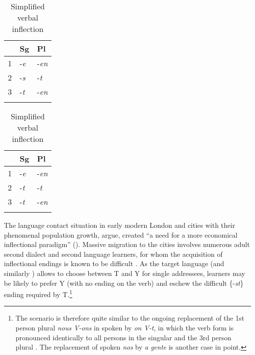 \documentclass[output=paper,hidelinks]{langscibook}
\begin{document}
\begin{table}
\caption{Present indicative in Middle Dutch \citep[195]{Aalberse2015}\label{tab5elsweiler}}
\begin{subtable}[b]{.5\linewidth}
\centering
\caption{Verbal inflection}
\begin{tabular}{l ll} 
  \lsptoprule
            & Sg & Pl\\ 
  \midrule
  1  & -\textit{e}  & -\textit{en} \\
  2  & -\textit{s}  & -\textit{t}  \\
  3  & -\textit{t}  & -\textit{en} \\
  \lspbottomrule
 \end{tabular}
\end{subtable}%
\begin{subtable}[b]{.5\linewidth}
\centering
\caption{Simplified verbal inflection}
 \begin{tabular}{l ll} 
  \lsptoprule
            & Sg & Pl\\ 
  \midrule
  1  & -\textit{e}  & -\textit{en} \\
  2  & -\textit{t}  & -\textit{t}  \\
  3  & -\textit{t}  & -\textit{en} \\
  \lspbottomrule
 \end{tabular}
\end{subtable}
\end{table}

The language contact situation in early modern London and  cities with their phenomenal population growth, \citeauthor{Aalberse2015} argue, created \enquote{a need for a more economical inflectional paradigm} (\citeyear[193]{Aalberse2015}). Massive migration to the cities involves numerous adult second dialect and second language learners, for whom the acquisition of inflectional endings is known to be difficult \citep[cf. e.g.][]{Blom2006}. As the target language  (and similarly ) allows to choose between T and Y for single addressees, learners may be likely to prefer Y (with no ending on the verb) and eschew the difficult \{-\textit{st}\} ending required by T.\footnote{The scenario is therefore quite similar to the ongoing replacement of the 1st person plural \textit{nous V-ons} in spoken  by \textit{on V-t}, in which the verb form is pronounced identically to all persons in the singular and the 3rd person plural \citep[cf.][]{King2011}. The replacement of spoken  \textit{nos} by \textit{a gente} is another case in point.} 
\end{document}
